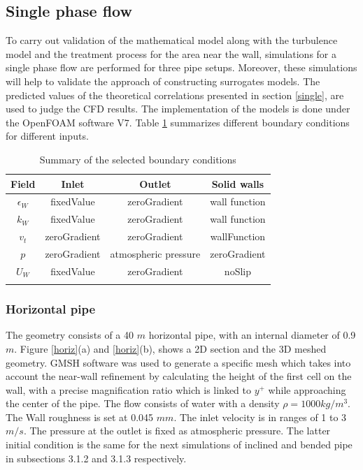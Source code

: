 \documentclass[review,3p,times,12pt]{elsarticle}
\begin{document}
\subsection{Single phase flow} \label{single flow}
To carry out validation of the mathematical model along with the turbulence model and the treatment process for the area near the wall, simulations for a single phase flow are performed for three pipe setups. Moreover, these simulations will help to validate the approach of constructing surrogates models. The predicted values of the theoretical correlations presented in section \ref{single}, are used to judge the CFD results. The implementation of the models is done under the OpenFOAM software V7. Table \ref{table 2} summarizes different boundary conditions for different inputs. 

\begin{table}[H]
\begin{center}
\caption{Summary of the selected boundary conditions}
\begin{tabular}{cccc}
\hline Field & Inlet & Outlet & Solid walls  \\
\hline
\(\epsilon_{W}\) & fixedValue & zeroGradient & wall function\\
\(k_{W}\) & fixedValue & zeroGradient & wall function \\
\(v_{t}\) & zeroGradient & zeroGradient & wallFunction \\
\(p\) & zeroGradient & atmospheric pressure & zeroGradient  \\
\(U_W\) & fixedValue  & zeroGradient & noSlip \\
\hline
\label{table 2}
\end{tabular}
\end{center}
\end{table}

\subsubsection{Horizontal pipe}
The geometry consists of a 40 $m$ horizontal pipe, with an internal diameter of 0.9 $m$. Figure \ref{horiz}(a) and \ref{horiz}(b), shows a 2D section and the 3D meshed geometry. GMSH software was used to generate a specific mesh which takes into account the near-wall refinement by calculating the height of the first cell on the wall, with a precise magnification ratio which is linked to $y^{+}$ while approaching the center of the pipe. The flow consists of water with a density $\rho=1000 kg/m^3$. The Wall roughness is set at 0.045 $mm$. The inlet velocity is in ranges of 1 to 3 $m/s$. The pressure at the outlet is fixed as atmospheric pressure. The latter initial condition is the same for the next simulations of inclined and bended pipe in subsections 3.1.2 and 3.1.3 respectively.
\end{document}
